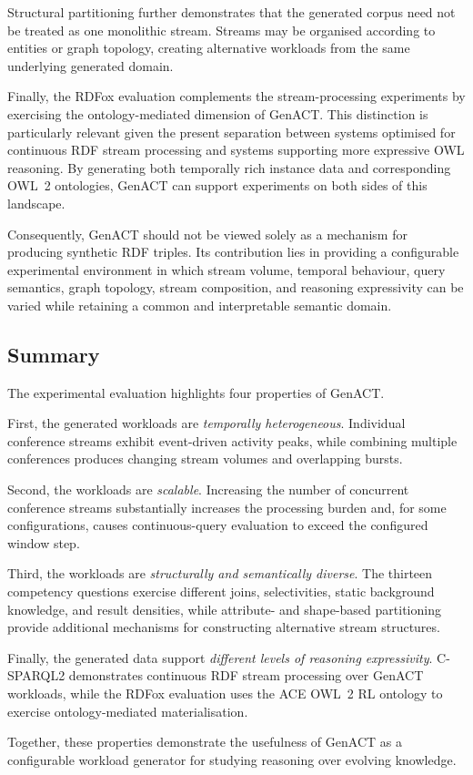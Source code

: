 Structural partitioning further demonstrates that the generated corpus need not
be treated as one monolithic stream. Streams may be organised according to
entities or graph topology, creating alternative workloads from the same
underlying generated domain.

Finally, the RDFox evaluation complements the stream-processing experiments by
exercising the ontology-mediated dimension of GenACT. This distinction is
particularly relevant given the present separation between systems optimised
for continuous RDF stream processing and systems supporting more expressive OWL
reasoning. By generating both temporally rich instance data and corresponding
OWL~2 ontologies, GenACT can support experiments on both sides of this
landscape.

Consequently, GenACT should not be viewed solely as a mechanism for producing
synthetic RDF triples. Its contribution lies in providing a configurable
experimental environment in which stream volume, temporal behaviour, query
semantics, graph topology, stream composition, and reasoning expressivity can
be varied while retaining a common and interpretable semantic domain.


\subsection{Summary}
\label{subsec:genact-evaluation-summary}

The experimental evaluation highlights four properties of GenACT.

First, the generated workloads are \emph{temporally heterogeneous}. Individual
conference streams exhibit event-driven activity peaks, while combining
multiple conferences produces changing stream volumes and overlapping bursts.

Second, the workloads are \emph{scalable}. Increasing the number of concurrent
conference streams substantially increases the processing burden and, for some
configurations, causes continuous-query evaluation to exceed the configured
window step.

Third, the workloads are \emph{structurally and semantically diverse}. The
thirteen competency questions exercise different joins, selectivities, static
background knowledge, and result densities, while attribute- and shape-based
partitioning provide additional mechanisms for constructing alternative stream
structures.

Finally, the generated data support \emph{different levels of reasoning
expressivity}. C-SPARQL2 demonstrates continuous RDF stream processing over
GenACT workloads, while the RDFox evaluation uses the ACE OWL~2 RL ontology to
exercise ontology-mediated materialisation.

Together, these properties demonstrate the usefulness of GenACT as a
configurable workload generator for studying reasoning over evolving knowledge.
